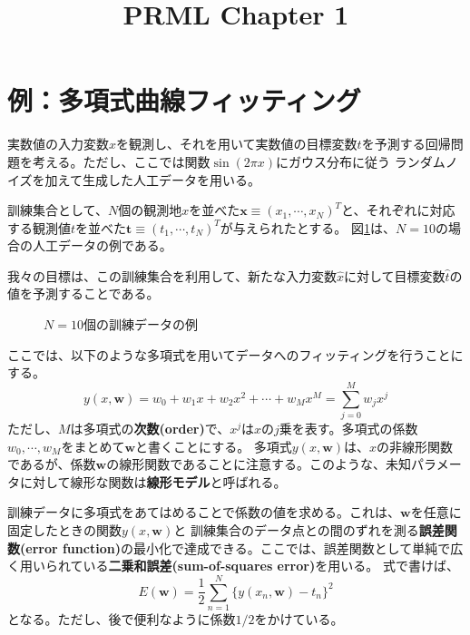 \documentclass[a4paper,uplatex]{jsarticle}
\numberwithin{equation}{section}
\numberwithin{figure}{section}
\numberwithin{table}{section}
\begin{document}
\title{PRML Chapter 1}
\author{}
\date{}
\maketitle

\section{例：多項式曲線フィッティング}
実数値の入力変数\(x\)を観測し、それを用いて実数値の目標変数\(t\)を予測する回帰問題を考える。ただし、ここでは関数\(\sin(2\pi x)\)にガウス分布に従う
ランダムノイズを加えて生成した人工データを用いる。

訓練集合として、\(N\)個の観測地\(x\)を並べた\(\bm{x} \equiv (x_1,\cdots,x_N)^T\)と、それぞれに対応する観測値\(t\)を並べた\(\bm{t} \equiv (t_1,\cdots,t_N)^T\)が与えられたとする。
図\ref{fig:toy data}は、\(N=10\)の場合の人工データの例である。

我々の目標は、この訓練集合を利用して、新たな入力変数\(\hat{x}\)に対して目標変数\(\hat{t}\)の値を予測することである。

\begin{figure}[htbp]
  \centering
  
  \caption{\(N=10\)個の訓練データの例}
  \label{fig:toy data}
\end{figure}

ここでは、以下のような多項式を用いてデータへのフィッティングを行うことにする。
\begin{equation}
  y(x,\bm{w}) = w_0 + w_1 x + w_2 x^2 + \cdots + w_M x^M = \sum_{j=0}^{M} w_j x^j
\end{equation}
ただし、\(M\)は多項式の\textbf{次数(order)}で、\(x^j\)は\(x\)の\(j\)乗を表す。多項式の係数\(w_0,\cdots,w_M\)をまとめて\(\bm{w}\)と書くことにする。
多項式\(y(x,\bm{w})\)は、\(x\)の非線形関数であるが、係数\(\bm{w}\)の線形関数であることに注意する。このような、未知パラメータに対して線形な関数は\textbf{線形モデル}と呼ばれる。

訓練データに多項式をあてはめることで係数の値を求める。これは、\(\bm{w}\)を任意に固定したときの関数\(y(x,\bm{w})\)と
訓練集合のデータ点との間のずれを測る\textbf{誤差関数(error function)}の最小化で達成できる。ここでは、誤差関数として単純で広く用いられている\textbf{二乗和誤差(sum-of-squares error)}を用いる。
式で書けば、
\begin{equation}
  E(\bm{w}) = \frac{1}{2} \sum_{n=1}^{N} \{y(x_n,\bm{w}) - t_n\}^2
  \label{eq:sum of squares error}
\end{equation}
となる。ただし、後で便利なように係数\(1/2\)をかけている。
\end{document}
